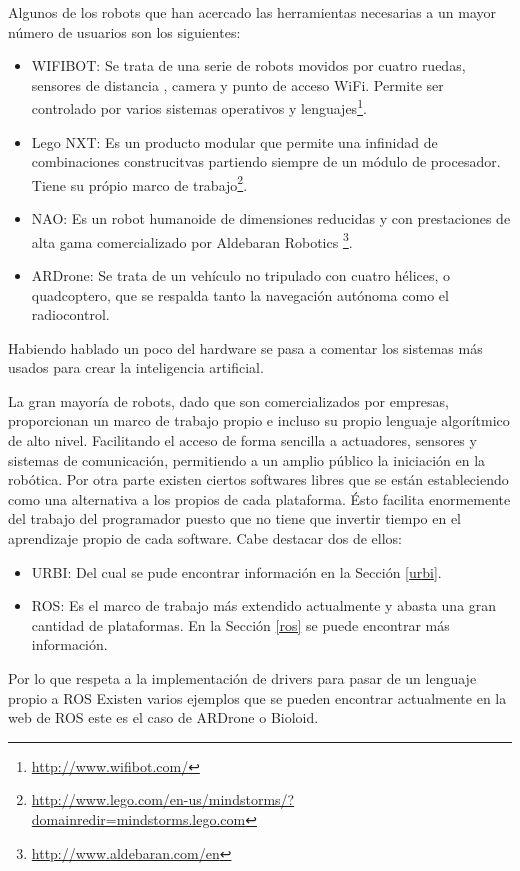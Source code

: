 \documentclass[12pt,a4paper,final,twoside]{article}
\begin{document}
Algunos de los robots que han acercado las herramientas necesarias a un mayor número de usuarios son los siguientes: 

\begin{itemize}
\item WIFIBOT: Se trata de una serie de robots movidos por cuatro ruedas, sensores de distancia , camera y punto de acceso WiFi. Permite ser controlado por varios sistemas operativos y lenguajes\footnote{\url{http://www.wifibot.com/}}.
\item Lego NXT: Es un producto modular que permite una infinidad de combinaciones construcitvas partiendo siempre de un módulo de procesador. Tiene su própio marco de trabajo\footnote{\url{http://www.lego.com/en-us/mindstorms/?domainredir=mindstorms.lego.com}}.
\item NAO: Es un robot humanoide de dimensiones reducidas y con prestaciones de alta gama comercializado por Aldebaran Robotics \footnote{\url{http://www.aldebaran.com/en}}.
\item ARDrone: Se trata de un vehículo no tripulado con cuatro hélices, o quadcoptero,  que se respalda tanto la navegación autónoma como el radiocontrol.
\end{itemize}

Habiendo hablado un poco del hardware se pasa a comentar los sistemas más usados para crear la inteligencia artificial.

La gran mayoría de robots, dado que son comercializados por empresas, proporcionan un marco de trabajo propio e incluso su propio lenguaje algorítmico de alto nivel. Facilitando el acceso de forma sencilla a actuadores, sensores y sistemas de comunicación, permitiendo a un amplio público la iniciación en la robótica.
Por otra parte existen ciertos softwares libres que se están estableciendo como una alternativa a los propios de cada plataforma.
Ésto facilita enormemente del trabajo del programador puesto que no tiene que invertir tiempo en el aprendizaje propio de cada software. 
Cabe destacar dos de ellos:

\begin{itemize}
\item URBI: Del cual se pude encontrar información en la Sección \ref{urbi}.
\item ROS: Es el marco de trabajo más extendido actualmente y abasta una gran cantidad de plataformas. En la Sección \ref{ros} se puede encontrar más información.
\end{itemize} 

Por lo que respeta a la implementación de drivers para pasar de un lenguaje propio a ROS Existen varios ejemplos que se pueden encontrar actualmente en la web de ROS este es el caso de ARDrone o Bioloid. 
\end{document}
